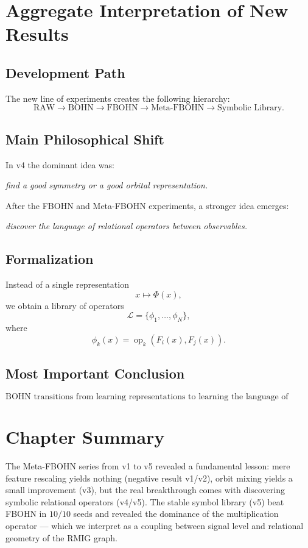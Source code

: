 \documentclass[11pt,a4paper]{report}
\begin{document}
\section{Aggregate Interpretation of New Results}
\label{sec:zbiorcza_rmig_fbohn}

\subsection{Development Path}
The new line of experiments creates the following hierarchy:
\[
\text{RAW}\to\text{BOHN}\to\text{FBOHN}\to\text{Meta-FBOHN}\to\text{Symbolic Library}.
\]

\subsection{Main Philosophical Shift}
In v4 the dominant idea was:
\begin{center}
\emph{find a good symmetry or a good orbital representation.}
\end{center}
After the FBOHN and Meta-FBOHN experiments, a stronger idea emerges:
\begin{center}
\emph{discover the language of relational operators between observables.}
\end{center}

\subsection{Formalization}
Instead of a single representation
\[
x\mapsto \Phi(x),
\]
we obtain a library of operators
\[
\mathcal{L}=\{\phi_1,\ldots,\phi_N\},
\]
where
\[
\phi_k(x)=\operatorname{op}_k(F_i(x),F_j(x)).
\]

\subsection{Most Important Conclusion}
\[
\boxed{\text{BOHN transitions from learning representations to learning the language of relations.}}
\]

\section{Chapter Summary}

The Meta-FBOHN series from v1 to v5 revealed a fundamental lesson: mere feature rescaling yields nothing (negative result v1/v2), orbit mixing yields a small improvement (v3), but the real breakthrough comes with discovering symbolic relational operators (v4/v5). The stable symbol library (v5) beat FBOHN in $10/10$ seeds and revealed the dominance of the multiplication operator --- which we interpret as a coupling between signal level and relational geometry of the RMIG graph.
\end{document}
